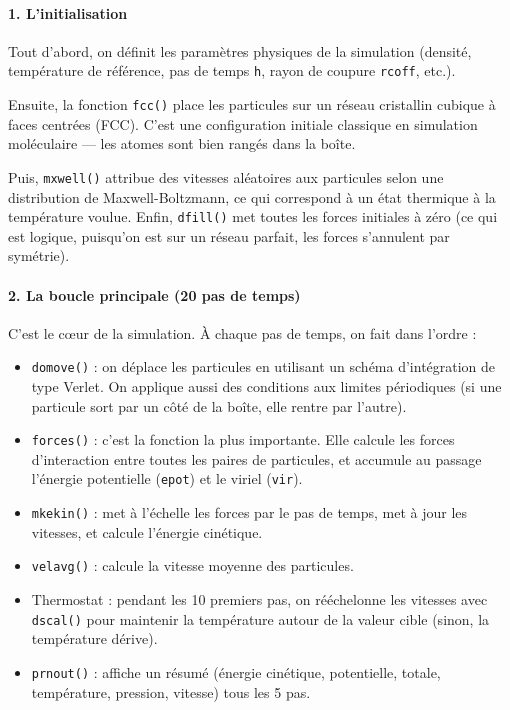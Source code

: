 \documentclass[12pt,a4paper]{article}
\begin{document}
\paragraph{\color{deeporange}1. L'initialisation}

Tout d'abord, on définit les paramètres physiques de la simulation (densité, température de référence, pas de temps \texttt{h}, rayon de coupure \texttt{rcoff}, etc.).

Ensuite, la fonction \texttt{fcc()} place les particules sur un réseau cristallin cubique à faces centrées (FCC). C'est une configuration initiale classique en simulation moléculaire — les atomes sont bien rangés dans la boîte.

Puis, \texttt{mxwell()} attribue des vitesses aléatoires aux particules selon une distribution de Maxwell-Boltzmann, ce qui correspond à un état thermique à la température voulue. Enfin, \texttt{dfill()} met toutes les forces initiales à zéro (ce qui est logique, puisqu'on est sur un réseau parfait, les forces s'annulent par symétrie).

\paragraph{\color{deeporange}2. La boucle principale (20 pas de temps)}

C'est le cœur de la simulation. À chaque pas de temps, on fait dans l'ordre :

\begin{itemize}[leftmargin=2em]
  \item \textcolor{accentblue}{\texttt{domove()}} : on déplace les particules en utilisant un schéma d'intégration de type Verlet. On applique aussi des conditions aux limites périodiques (si une particule sort par un côté de la boîte, elle rentre par l'autre).
  \item \textcolor{accentblue}{\texttt{forces()}} : c'est la fonction la plus importante. Elle calcule les forces d'interaction entre toutes les paires de particules, et accumule au passage l'énergie potentielle (\texttt{epot}) et le viriel (\texttt{vir}).
  \item \textcolor{accentblue}{\texttt{mkekin()}} : met à l'échelle les forces par le pas de temps, met à jour les vitesses, et calcule l'énergie cinétique.
  \item \textcolor{accentblue}{\texttt{velavg()}} : calcule la vitesse moyenne des particules.
  \item \textcolor{accentblue}{Thermostat} : pendant les 10 premiers pas, on rééchelonne les vitesses avec \texttt{dscal()} pour maintenir la température autour de la valeur cible (sinon, la température dérive).
  \item \textcolor{accentblue}{\texttt{prnout()}} : affiche un résumé (énergie cinétique, potentielle, totale, température, pression, vitesse) tous les 5 pas.
\end{itemize}
\end{document}
